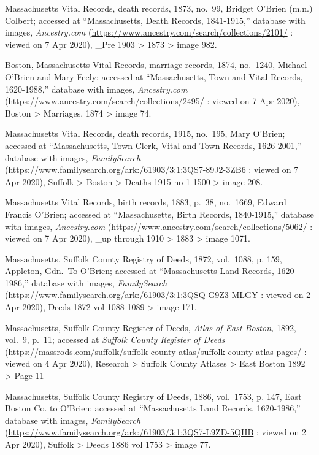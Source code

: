 \begin{thebibliography}{999}
	Massachusetts Vital Records, death records, 1873, no.\ 99, Bridget O'Brien (m.n.) Colbert; accessed at ``Massachusetts, Death Records, 1841-1915,'' database with images, \textit{Ancestry.com} (\url{https://www.ancestry.com/search/collections/2101/} : viewed on 7 Apr 2020), \_Pre 1903 > 1873 > image 982.
	
	Boston, Massachusetts Vital Records, marriage records, 1874, no.\ 1240, Michael O'Brien and Mary Feely; accessed at ``Massachusetts, Town and Vital Records, 1620-1988,'' database with images, \textit{Ancestry.com} (\url{https://www.ancestry.com/search/collections/2495/} : viewed on 7 Apr 2020), Boston > Marriages, 1874 > image 74.
	
	Massachusetts Vital Records, death records, 1915, no.\ 195, Mary O'Brien; accessed at ``Massachusetts, Town Clerk, Vital and Town Records, 1626-2001,'' database with images, \textit{FamilySearch} (\url{https://www.familysearch.org/ark:/61903/3:1:3QS7-89J2-3ZB6} : viewed on 7 Apr 2020), Suffolk > Boston > Deaths 1915 no 1-1500 > image 208.
	
	Massachusetts Vital Records, birth records, 1883, p.\ 38, no.\ 1669, Edward Francis O'Brien; accessed at ``Massachusetts, Birth Records, 1840-1915,'' database with images, \textit{Ancestry.com} (\url{https://www.ancestry.com/search/collections/5062/} : viewed on 7 Apr 2020), \_up through 1910 > 1883 > image 1071.
	
	Massachusetts, Suffolk County Registry of Deeds, 1872, vol.\ 1088, p. 159, Appleton, Gdn.\ To O’Brien; accessed at ``Massachusetts Land Records, 1620-1986,'' database with images, \textit{FamilySearch} (\url{https://www.familysearch.org/ark:/61903/3:1:3QSQ-G9Z3-MLGY} : viewed on 2 Apr 2020), Deeds 1872 vol 1088-1089 > image 171.
	
	Massachusetts, Suffolk County Register of Deeds, \textit{Atlas of East Boston,} 1892, vol.\ 9, p.\ 11; accessed at \textit{Suffolk County Register of Deeds} (\url{https://massrods.com/suffolk/suffolk-county-atlas/suffolk-county-atlas-pages/} : viewed on 4 Apr 2020), Research > Suffolk County Atlases > East Boston 1892 > Page 11
	
	Massachusetts, Suffolk County Registry of Deeds, 1886, vol.\ 1753, p. 147, East Boston Co. to O’Brien; accessed at ``Massachusetts Land Records, 1620-1986,'' database with images, \textit{FamilySearch} (\url{https://www.familysearch.org/ark:/61903/3:1:3QS7-L9ZD-5QHB} : viewed on 2 Apr 2020), Suffolk > Deeds 1886 vol 1753 > image 77.
	

\end{thebibliography}
